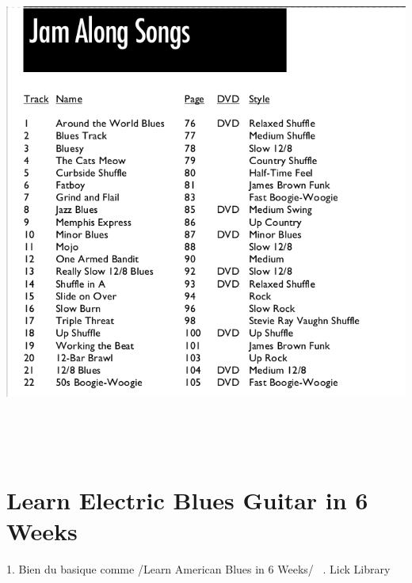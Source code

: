 \documentclass[a4paper]{book}
\begin{document}
\begin{center}
\includegraphics[width=17cm,height=16.628cm]{lebluessupportsmethodes-img125.png}
\end{center}





\clearpage\section[Learn Electric Blues Guitar in 6 Weeks]{Learn
Electric Blues Guitar in 6 Weeks}
\hypertarget{RefHeadingToc176973218262}{}1. Bien du basique comme /Learn
American Blues in 6 Weeks/ \ . Lick Library
\end{document}
